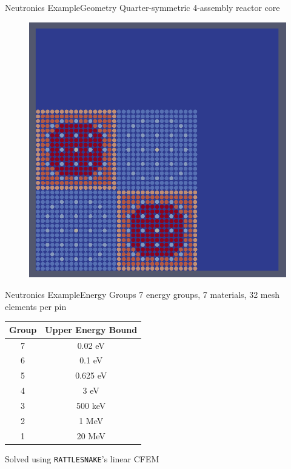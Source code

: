 \documentclass{beamer}
\begin{document}
\begin{frame}{Neutronics Example}{Geometry}%
  \vfill
  Quarter-symmetric 4-assembly reactor core
  \vfill
  \begin{figure}
    \centering
    \includegraphics[width=0.5\linewidth]{c5g7/geom}
  \end{figure}
  \vfill
\end{frame}

\begin{frame}{Neutronics Example}{Energy Groups}%
7 energy groups, 7 materials, 32 mesh elements per pin
  \begin{table}
    \centering{}
    \begin{tabular}{c c}
      Group & Upper Energy Bound \\ \hline
      7 & 0.02 eV\\
      6 & 0.1 eV\\
      5 & 0.625 eV\\
      4 & 3 eV\\
      3 & 500 keV \\
      2 & 1 MeV \\
      1 & 20 MeV
    \end{tabular}
  \end{table}
Solved using \texttt{RATTLESNAKE}'s linear CFEM
\end{frame}
\end{document}
